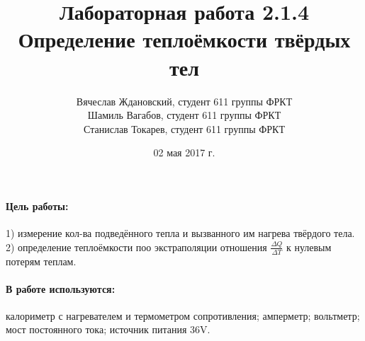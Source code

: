 \documentclass[a4paper]{article}
\title{Лабораторная работа 2.1.4 \\Определение теплоёмкости твёрдых тел}
\date{02 мая 2017 г.}
\author{Вячеслав Ждановский, студент 611 группы ФРКТ\\
Шамиль Вагабов, студент 611 группы ФРКТ\\
Станислав Токарев, студент 611 группы ФРКТ}
\begin{document}
	\maketitle
	\newpage
	\paragraph{Цель работы:} 1) измерение кол-ва подведённого тепла и вызванного им нагрева твёрдого тела. 2) определение теплоёмкости поо экстраполяции отношения $\frac{\Delta Q}{\Delta T}$ к нулевым потерям теплам. 
	\paragraph{В работе используются:} 
	калориметр с нагревателем и термометром сопротивления; амперметр; вольтметр; мост постоянного тока; источник питания 36V.
\end{document}
